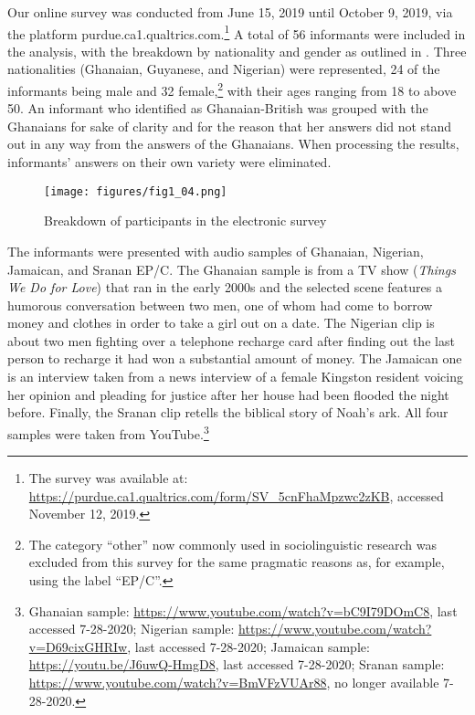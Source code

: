 \documentclass[output=paper,colorlinks,citecolor=brown]{langscibook}
\begin{document}
Our online survey was conducted from June 15, 2019 until October 9, 2019, via the platform purdue.ca1.qualtrics.com.\footnote{The survey was available at: \href{https://purdue.ca1.qualtrics.com/jfe/form/SV_5cnFhaMpzwc2zKB}{https://purdue.ca1.qualtrics.com/form/SV\_5cnFhaMpzwc2zKB}, accessed November 12, 2019.} A total of 56 informants were included in the analysis, with the breakdown by nationality and gender as outlined in . Three nationalities (Ghanaian, Guyanese, and Nigerian) were represented, 24 of the informants being male and 32 female,\footnote{The category “other” now commonly used in sociolinguistic research was excluded from this survey for the same pragmatic reasons as, for example, using the label “EP/C”.}  with their ages ranging from 18 to above 50. An informant who identified as Ghanaian-British was grouped with the Ghanaians for sake of clarity and for the reason that her answers did not stand out in any way from the answers of the Ghanaians. When processing the results, informants’ answers on their own variety were eliminated.

\begin{figure}
    \texttt{[image: figures/fig1\_04.png]}
    \caption{Breakdown of participants in the electronic survey}
    \label{fig:fig1_04}
\end{figure}

The informants were presented with audio samples of Ghanaian, Nigerian, Jamaican, and Sranan EP/C. The Ghanaian sample is from a TV show (\emph{Things We Do for Love}) that ran in the early 2000s and the selected scene features a humorous conversation between two men, one of whom had come to borrow money and clothes in order to take a girl out on a date. The Nigerian clip is about two men fighting over a telephone recharge card after finding out the last person to recharge it had won a substantial amount of money. The Jamaican one is an interview taken from a news interview of a female Kingston resident voicing her opinion and pleading for justice after her house had been flooded the night before. Finally, the Sranan clip retells the biblical story of Noah’s ark. All four samples were taken from YouTube.\footnote{Ghanaian sample: \url{https://www.youtube.com/watch?v=bC9I79DOmC8}, last accessed 7-28-2020; Nigerian sample:  \url{https://www.youtube.com/watch?v=D69cixGHRIw}, last accessed 7-28-2020; Jamaican sample: \url{https://youtu.be/J6uwQ-HmgD8}, last accessed 7-28-2020; Sranan sample: \url{https://www.youtube.com/watch?v=BmVFzVUAr88}, no longer available 7-28-2020.} 
\end{document}
